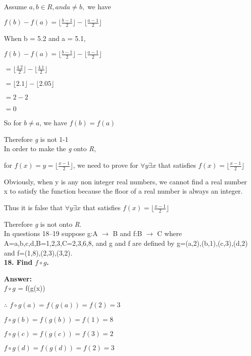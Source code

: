 \documentclass{article}
\begin{document}
\begin{large}
Assume $a, b \in R, and a \neq b,$ we have

$f(b) - f(a) = \lfloor \frac{b-1}{2} \rfloor - \lfloor \frac{a-1}{2} \rfloor$

When b = 5.2 and a = 5.1, 

$f(b) - f(a) = \lfloor \frac{b-1}{2} \rfloor - \lfloor \frac{a-1}{2} \rfloor$

            $= \lfloor \frac{4.2}{2} \rfloor - \lfloor \frac{4.1}{2} \rfloor$
            
            $= \lfloor 2.1 \rfloor - \lfloor 2.05 \rfloor$
            
            $= 2 - 2$
            
            $= 0$
            
So for $b \neq a$, we have $f(b) = f(a)$

Therefore \emph{g} is not 1-1\\

In order to make the \emph{g} onto \emph{R}, 

for $f(x) = y = \lfloor \frac{x-1}{2}\rfloor$, we need to prove for $\forall y \exists x$ that satisfies $f(x) = \lfloor \frac{x-1}{2}\rfloor$

Obviously, when y is any non integer real numbers, we cannot find a real number x to satisfy the function because the floor of a real number is always an integer.

Thus it is false that $\forall y \exists x$ that satisfies $f(x) = \lfloor \frac{x-1}{2}\rfloor$

Therefore \emph{g} is not onto \emph{R}.\\


In questions 18–19 suppose g:A $\to$ B and f:B $\to$ C where A={a,b,c,d},B={1,2,3},C={2,3,6,8}, and g and f are defined by g={(a,2),(b,1),(c,3),(d,2)} and f={(1,8),(2,3),(3,2)}.\\

\textbf{18. Find $f\circ g$.}

\textbf{Answer:} \\

$f \circ g$ = f(g(x))

$\therefore$ $f \circ g(a) = f(g(a)) = f(2) = 3$

             $f \circ g(b) = f(g(b)) = f(1) = 8$
             
             $f \circ g(c) = f(g(c)) = f(3) = 2$
             
             $f \circ g(d) = f(g(d)) = f(2) = 3$
             

\end{large}
\end{document}

